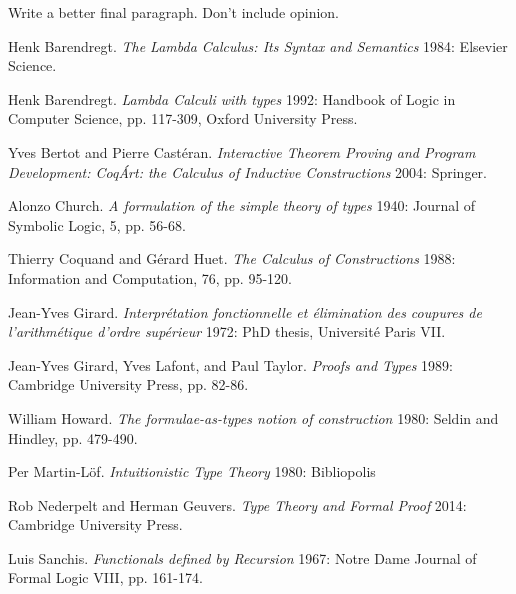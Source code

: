 \documentclass[9pt,preprint,nocopyrightspace,computermodern]{sigplanconf} %
\begin{document}
Write a better final paragraph. Don't include opinion.
\begin{thebibliography}{1}

 Henk Barendregt. {\em The Lambda Calculus: Its Syntax and Semantics}
  1984: Elsevier Science.

 Henk Barendregt. {\em Lambda Calculi with types}
  1992: Handbook of Logic in Computer Science, pp. 117-309, Oxford University Press.

 Yves Bertot and Pierre Cast\'eran. {\em Interactive Theorem Proving and Program
  Development: Coq\'Art: the Calculus of Inductive Constructions} 2004: Springer.

 Alonzo Church. {\em A formulation of the simple theory of types}
  1940: Journal of Symbolic Logic, 5, pp. 56-68.

 Thierry Coquand and G\'erard Huet. {\em The Calculus of Constructions}
  1988: Information and Computation, 76, pp. 95-120.

 Jean-Yves Girard. {\em Interpr\'etation fonctionnelle et \'elimination des coupures de l’arithm\'etique d’ordre sup\'erieur}
  1972: PhD thesis, Universit\'e Paris VII.

 Jean-Yves Girard, Yves Lafont, and Paul Taylor. {\em Proofs and Types}
  1989: Cambridge University Press, pp. 82-86.

 William Howard. {\em The formulae-as-types notion of construction}
  1980: Seldin and Hindley, pp. 479-490.

 Per Martin-L\"of. {\em Intuitionistic Type Theory}
  1980: Bibliopolis

 Rob Nederpelt and Herman Geuvers. {\em Type Theory and Formal Proof}
  2014: Cambridge University Press.
  
 Luis Sanchis. {\em Functionals defined by Recursion}
  1967: Notre Dame Journal of Formal Logic VIII, pp. 161-174.
  
\end{thebibliography}
\end{document}
